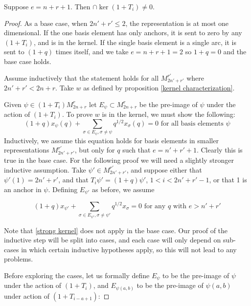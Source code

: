 \documentclass{amsart}
\begin{document}
 \vspace{5mm}
 \begin{theorem}
 	Suppose $e=n+r+1$. Then $\cap\ker(1+T_i)\not=0$.
 	\label{kernel existence}
 \end{theorem}
 
 \begin{proof}
 	
 	
 	As a base case, when $2n'+r'\leq 2$, the representation is at most one dimensional. If the one basis element has only anchors, it is sent to zero by any $(1+T_i)$, and is in the kernel. If the single basis element is a single arc, it is sent to $(1+q)$ times itself, and we take $e=n+r+1=2$ so $1+q=0$ and the base case holds.
 	
 	\vspace{5mm}
 	
 	Assume inductively that the statement holds for all $M_{2n'+r'}^{r'}$ where $2n'+r'<2n+r$. Take $w$ as defined by proposition \ref{kernel characterization}.
 	
 	Given $\psi\in (1+T_i)M_{2n+r}^r$ let $E_\psi\subset M_{2n+r}^r$ be the pre-image of $\psi$ under the action of $(1+T_i)$. To prove $w$ is in the kernel, we must show the following: 
 	\begin{equation}
 	(1+q)x_\psi(q)+\sum_{\sigma\in E_\psi,\sigma\not=\psi}q^{1/2}x_\sigma(q)=0\text{ for all basis elements }\psi
 	\label{weak kernel}
 	\end{equation}
 	Inductively, we assume this equation holds for basis elements in smaller representations $M_{2n'+r'}^{r'}$, but only for $q$ such that $e=n'+r'+1$. Clearly this is true in the base case. For the following proof we will need a slightly stronger inductive assumption. Take $\psi'\in M_{2n'+r'}^{r'}$, and suppose either that $\psi'(1)=2n'+r'$, and that $T_i\psi'=(1+q)\psi'$, $1<i<2n'+r'-1$, or that 1 is an anchor in $\psi$. Defining $E_{\psi'}$ as before, we assume
 	
 	\begin{equation}
 	(1+q)x_{\psi'}+\sum_{\sigma\in E_{\psi'},\sigma\not=\psi'}q^{1/2}x_\sigma=0\text{ for any } q \text{ with }e>n'+r'
 	\label{strong kernel}
 	\end{equation}
 	
 	Note that \ref{strong kernel} does not apply in the base case. Our proof of the inductive step will be split into cases, and each case will only depend on sub-cases in which certain inductive hypotheses apply, so this will not lead to any problems.
 	
 	Before exploring the cases, let us formally define $E_\psi$ to be the pre-image of $\psi$ under the action of $(1+T_i)$, and $E_{\psi(a,b)}$ to be the pre-image of $\psi(a,b)$ under action of $(1+T_{i-a+1})$:
 	

\end{proof}
\end{document}
